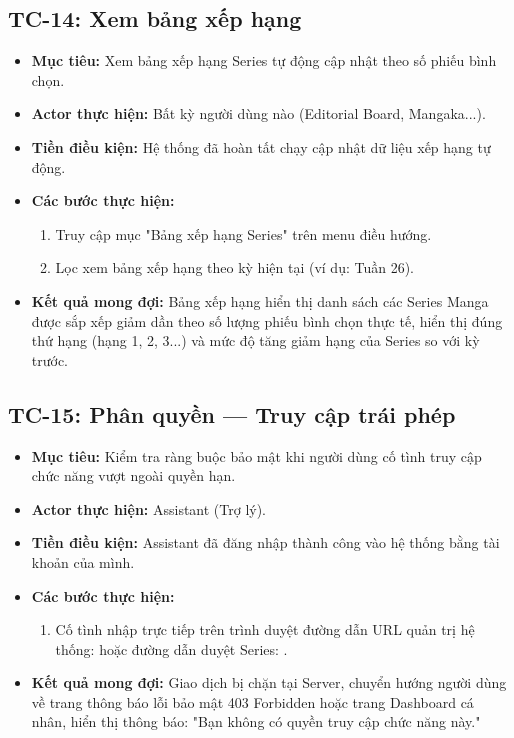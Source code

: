 \subsection{TC-14: Xem bảng xếp hạng}
\label{subsec:tc14_view_ranking}
\begin{itemize}
    \item \textbf{Mục tiêu:} Xem bảng xếp hạng Series tự động cập nhật theo số phiếu bình chọn.
    \item \textbf{Actor thực hiện:} Bất kỳ người dùng nào (Editorial Board, Mangaka...).
    \item \textbf{Tiền điều kiện:} Hệ thống đã hoàn tất chạy cập nhật dữ liệu xếp hạng tự động.
    \item \textbf{Các bước thực hiện:}
    \begin{enumerate}
        \item Truy cập mục "Bảng xếp hạng Series" trên menu điều hướng.
        \item Lọc xem bảng xếp hạng theo kỳ hiện tại (ví dụ: Tuần 26).
    \end{enumerate}
    \item \textbf{Kết quả mong đợi:} Bảng xếp hạng hiển thị danh sách các Series Manga được sắp xếp giảm dần theo số lượng phiếu bình chọn thực tế, hiển thị đúng thứ hạng (hạng 1, 2, 3...) và mức độ tăng giảm hạng của Series so với kỳ trước.
\end{itemize}

\subsection{TC-15: Phân quyền — Truy cập trái phép}
\label{subsec:tc15_auth_violation}
\begin{itemize}
    \item \textbf{Mục tiêu:} Kiểm tra ràng buộc bảo mật khi người dùng cố tình truy cập chức năng vượt ngoài quyền hạn.
    \item \textbf{Actor thực hiện:} Assistant (Trợ lý).
    \item \textbf{Tiền điều kiện:} Assistant đã đăng nhập thành công vào hệ thống bằng tài khoản của mình.
    \item \textbf{Các bước thực hiện:}
    \begin{enumerate}
        \item Cố tình nhập trực tiếp trên trình duyệt đường dẫn URL quản trị hệ thống:  hoặc đường dẫn duyệt Series: .
    \end{enumerate}
    \item \textbf{Kết quả mong đợi:} Giao dịch bị chặn tại Server, chuyển hướng người dùng về trang thông báo lỗi bảo mật 403 Forbidden hoặc trang Dashboard cá nhân, hiển thị thông báo: "Bạn không có quyền truy cập chức năng này."
\end{itemize}

